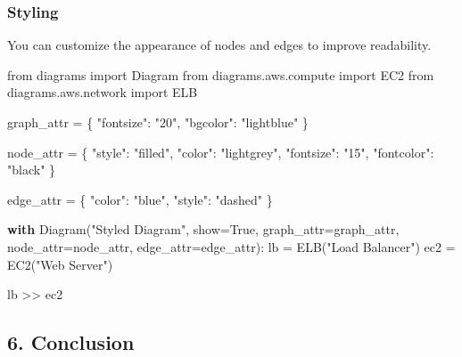 \documentclass[
  letterpaper,
  DIV=11,
  numbers=noendperiod]{scrreprt}
\newenvironment{Shaded}{\begin{snugshade}}{\end{snugshade}}
\newcommand{\ControlFlowTok}[1]{\textcolor[rgb]{0.00,0.23,0.31}{\textbf{#1}}}
\newcommand{\ImportTok}[1]{\textcolor[rgb]{0.00,0.46,0.62}{#1}}
\newcommand{\NormalTok}[1]{\textcolor[rgb]{0.00,0.23,0.31}{#1}}
\newcommand{\OperatorTok}[1]{\textcolor[rgb]{0.37,0.37,0.37}{#1}}
\newcommand{\StringTok}[1]{\textcolor[rgb]{0.13,0.47,0.30}{#1}}
\newcommand{\VariableTok}[1]{\textcolor[rgb]{0.07,0.07,0.07}{#1}}
\begin{document}
\subsubsection{Styling}\label{styling}

You can customize the appearance of nodes and edges to improve
readability.

\begin{Shaded}
\begin{Highlighting}[]
\ImportTok{from}\NormalTok{ diagrams }\ImportTok{import}\NormalTok{ Diagram}
\ImportTok{from}\NormalTok{ diagrams.aws.compute }\ImportTok{import}\NormalTok{ EC2}
\ImportTok{from}\NormalTok{ diagrams.aws.network }\ImportTok{import}\NormalTok{ ELB}

\NormalTok{graph\_attr }\OperatorTok{=}\NormalTok{ \{}
    \StringTok{"fontsize"}\NormalTok{: }\StringTok{"20"}\NormalTok{,}
    \StringTok{"bgcolor"}\NormalTok{: }\StringTok{"lightblue"}
\NormalTok{\}}

\NormalTok{node\_attr }\OperatorTok{=}\NormalTok{ \{}
    \StringTok{"style"}\NormalTok{: }\StringTok{"filled"}\NormalTok{,}
    \StringTok{"color"}\NormalTok{: }\StringTok{"lightgrey"}\NormalTok{,}
    \StringTok{"fontsize"}\NormalTok{: }\StringTok{"15"}\NormalTok{,}
    \StringTok{"fontcolor"}\NormalTok{: }\StringTok{"black"}
\NormalTok{\}}

\NormalTok{edge\_attr }\OperatorTok{=}\NormalTok{ \{}
    \StringTok{"color"}\NormalTok{: }\StringTok{"blue"}\NormalTok{,}
    \StringTok{"style"}\NormalTok{: }\StringTok{"dashed"}
\NormalTok{\}}

\ControlFlowTok{with}\NormalTok{ Diagram(}\StringTok{"Styled Diagram"}\NormalTok{, show}\OperatorTok{=}\VariableTok{True}\NormalTok{, graph\_attr}\OperatorTok{=}\NormalTok{graph\_attr, node\_attr}\OperatorTok{=}\NormalTok{node\_attr, edge\_attr}\OperatorTok{=}\NormalTok{edge\_attr):}
\NormalTok{    lb }\OperatorTok{=}\NormalTok{ ELB(}\StringTok{"Load Balancer"}\NormalTok{)}
\NormalTok{    ec2 }\OperatorTok{=}\NormalTok{ EC2(}\StringTok{"Web Server"}\NormalTok{)}
    
\NormalTok{    lb }\OperatorTok{\textgreater{}\textgreater{}}\NormalTok{ ec2}
\end{Highlighting}
\end{Shaded}

\subsection{6. Conclusion}\label{conclusion-29}
\end{document}
